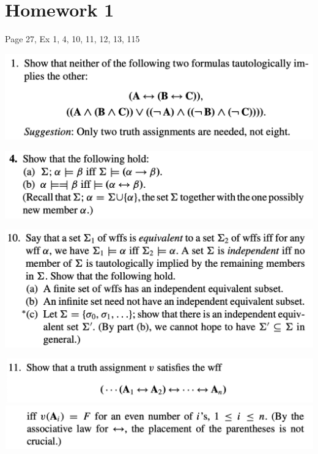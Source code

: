 \section{Homework 1}
Page 27, Ex 1, 4, 10, 11, 12, 13, 115

\includegraphics[width=400pt]{img/logic--berkeley-125a--homework-1-1a40.png}





\includegraphics[width=400pt]{img/logic--berkeley-125a--homework-1-346f.png}



\includegraphics[width=400pt]{img/logic--berkeley-125a--homework-1-1b3d.png}


\includegraphics[width=400pt]{img/logic--berkeley-125a--homework-1-079f.png}
\includegraphics[width=400pt]{img/logic--berkeley-125a--homework-1-8256.png}


